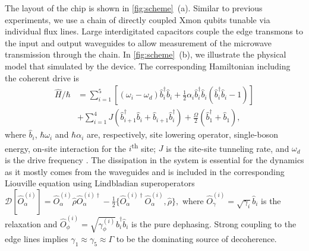 \documentclass[%
 aps, pra,
 amsmath,amssymb,
 reprint,%
superscriptaddress
]{revtex4-2}
\begin{document}
The layout of the chip is shown in \autoref{fig:scheme}~(a). Similar to previous experiments, we use a chain of directly coupled Xmon qubits tunable via individual flux lines. Large interdigitated capacitors couple the edge transmons to the input and output waveguides to allow measurement of the microwave transmission through the chain. In \autoref{fig:scheme}~(b), we illustrate the physical model that simulated by the device. The corresponding Hamiltonian including the coherent drive is
\begin{equation}
\begin{aligned}
\hat H/\hbar &= \sum_{i=1}^5\left[ (\omega_i - \omega_d) \hat b^\dag_i \hat b_i + \frac{1}{2} \alpha_i \hat b_i^\dag \hat b_i (\hat b^\dag_i \hat b_i - 1)\right]\\
&+\sum_{i=1}^4 J (\hat b^\dag_{i+1} \hat b_i + \hat b_{i+1} \hat b_i^\dag)+\frac{\Omega}{2}(\hat b_1^\dag + \hat b_1),
\end{aligned}\label{eq:bose-hubbard}
\end{equation} 
where $\hat b_i$, $\hbar \omega_i$ and $\hbar\alpha_i$ are, respectively, site lowering operator, single-boson energy, on-site interaction for the $i$\textsuperscript{th} site; $J$ is the site-site tunneling rate, and $\omega_d$ is the drive frequency \cite{egorova2020analog, PhysRevA.102.013707, yanay2020two}. The dissipation in the system is essential for the dynamics as it mostly comes from the waveguides and is included in the corresponding Liouville equation using Lindbladian superoperators $\mathcal D[\hat{O}^{(i)}_\alpha] = \hat{O}^{(i)}_\alpha \hat \rho \hat{O}^{(i)\dag}_\alpha - \frac{1}{2}\{\hat{O}^{(i)\dag}_\alpha \hat{O}^{(i)}_\alpha, \hat \rho\},$ where $\hat{O}^{(i)}_\gamma = \sqrt{\gamma_i} \hat b_i$ is the relaxation and $\hat{O}^{(i)}_\phi = \sqrt{\gamma^{(i)}_\phi} \hat b_i^\dag \hat b_i$ is the pure dephasing. Strong coupling to the edge lines implies $\gamma_1 \approx \gamma_5 \approx \Gamma$ to be the dominating source of decoherence.
\end{document}
